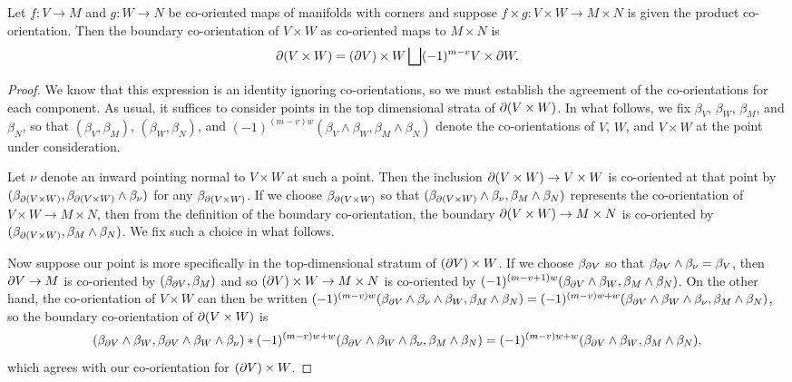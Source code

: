 \begin{proposition}\label{P: boundary of exterior product}
	Let $f \colon V \to M$ and $g \colon W \to N$ be co-oriented maps of manifolds with corners and suppose $f \times g \colon V \times W \to M \times N$ is given the product co-orientation.
	Then the boundary co-orientation of $V \times W$ as co-oriented maps to $M \times N$ is $$\partial(V \times W) = (\partial V) \times W \bigsqcup (-1)^{m-v}V \times \partial W.$$
\end{proposition}

\begin{proof}
	We know that this expression is an identity ignoring co-orientations, so we must establish the agreement of the co-orientations for each component.
	As usual, it suffices to consider points in the top dimensional strata of $\partial(V \times W)$.
	In what follows, we fix $\beta_V$, $\beta_W$, $\beta_M$, and $\beta_N$, so that $(\beta_V,\beta_M)$, $(\beta_W,\beta_N)$, and $(-1)^{(m-v)w}(\beta_V \wedge \beta_W,\beta_M \wedge \beta_N)$ denote the co-orientations of $V$, $W$, and $V \times W$ at the point under consideration.

	Let $\nu$ denote an inward pointing normal to $V \times W$ at such a point.
	Then the inclusion $\partial(V \times W) \to V \times W$ is co-oriented at that point by $(\beta_{\partial(V \times W)},\beta_{\partial(V \times W)} \wedge \beta_\nu)$ for any $\beta_{\partial(V \times W)}$.
	If we choose $\beta_{\partial(V \times W)}$ so that $(\beta_{\partial(V \times W)}\wedge\beta_\nu,\beta_M \wedge \beta_N)$ represents the co-orientation of $V \times W \to M \times N$, then from the definition of the boundary co-orientation, the boundary $\partial(V \times W) \to M \times N$ is co-oriented by $(\beta_{\partial(V \times W)},\beta_M \wedge \beta_N)$.
	We fix such a choice in what follows.

	Now suppose our point is more specifically in the top-dimensional stratum of $(\partial V) \times W$.
	If we choose $\beta_{\partial V}$ so that $\beta_{\partial V} \wedge \beta_\nu = \beta_V$, then $\partial V \to M$ is co-oriented by $(\beta_{\partial V},\beta_M)$ and so $(\partial V) \times W \to M \times N$ is co-oriented by $(-1)^{(m-v+1)w}(\beta_{\partial V} \wedge \beta_W,\beta_M \wedge \beta_N)$.
	On the other hand, the co-orientation of $V \times W$ can then be written $(-1)^{(m-v)w}(\beta_{\partial V} \wedge \beta_\nu \wedge \beta_W,\beta_M \wedge \beta_N) = (-1)^{(m-v)w+w}(\beta_{\partial V} \wedge \beta_W \wedge \beta_\nu,\beta_M \wedge \beta_N)$, so the boundary co-orientation of $\partial(V \times W)$ is $$(\beta_{\partial V} \wedge \beta_W,\beta_{\partial V} \wedge \beta_W \wedge \beta_\nu)*(-1)^{(m-v)w+w}(\beta_{\partial V} \wedge \beta_W \wedge \beta_\nu,\beta_M \wedge \beta_N) = (-1)^{(m-v)w+w}(\beta_{\partial V} \wedge \beta_W,\beta_M \wedge \beta_N),$$ 
	which agrees with our co-orientation for $(\partial V) \times W$.


\end{proof}
